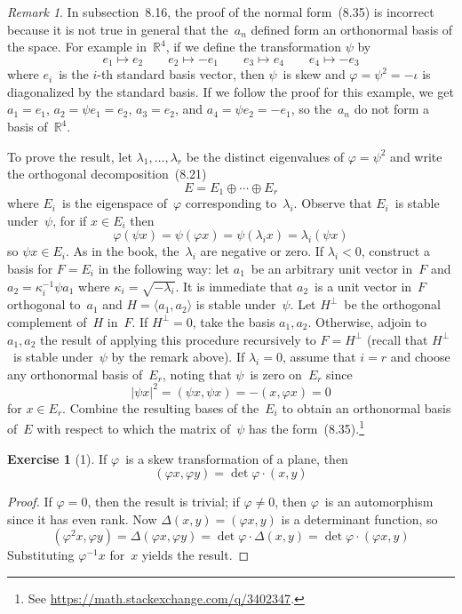 \documentclass[letterpaper,12pt]{article}
\newcommand{\R}{\mathbb{R}}
\newcommand{\dsum}{\oplus}
\newcommand{\mult}{\cdot}
\newcommand{\gen}[1]{\langle#1\rangle}
\newcommand{\oc}[1]{#1^{\perp}}
\newcommand{\iprod}[2]{(#1,#2)}
\newcommand{\norm}[1]{|#1|}
\theoremstyle{definition}
\newtheorem*{exer}{Exercise}
\theoremstyle{remark}
\newtheorem*{rmk}{Remark}
\begin{document}
\begin{rmk}
In subsection~8.16, the proof of the normal form~(8.35) is incorrect because it is not true in general that the~\(a_n\) defined form an orthonormal basis of the space. For example in~\(\R^4\), if we define the transformation \(\psi\) by
\[e_1\mapsto e_2\qquad e_2\mapsto -e_1\qquad e_3\mapsto e_4\qquad e_4\mapsto -e_3\]
where \(e_i\)~is the \(i\)-th standard basis vector, then \(\psi\)~is skew and \(\varphi=\psi^2=-\iota\) is diagonalized by the standard basis. If we follow the proof for this example, we get \(a_1=e_1\), \(a_2=\psi e_1=e_2\), \(a_3=e_2\), and \(a_4=\psi e_2=-e_1\), so the~\(a_n\) do not form a basis of~\(\R^4\).

To prove the result, let \(\lambda_1,\ldots,\lambda_r\) be the distinct eigenvalues of \(\varphi=\psi^2\) and write the orthogonal decomposition~(8.21)
\[E=E_1\dsum\cdots\dsum E_r\]
where \(E_i\)~is the eigenspace of~\(\varphi\) corresponding to~\(\lambda_i\). Observe that \(E_i\)~is stable under~\(\psi\), for if \(x\in E_i\) then
\[\varphi(\psi x)=\psi(\varphi x)=\psi(\lambda_i x)=\lambda_i(\psi x)\]
so \(\psi x\in E_i\). As in the book, the~\(\lambda_i\) are negative or zero. If \(\lambda_i<0\), construct a basis for \(F=E_i\) in the following way: let \(a_1\)~be an arbitrary unit vector in~\(F\) and \(a_2=\kappa_i^{-1}\psi a_1\) where \(\kappa_i=\sqrt{-\lambda_i}\). It is immediate that \(a_2\)~is a unit vector in~\(F\) orthogonal to~\(a_1\) and \(H=\gen{a_1,a_2}\) is stable under~\(\psi\). Let \(\oc{H}\)~be the orthogonal complement of~\(H\) in~\(F\). If \(\oc{H}=0\), take the basis \(a_1,a_2\). Otherwise, adjoin to \(a_1,a_2\) the result of applying this procedure recursively to \(F=\oc{H}\) (recall that \(\oc{H}\)~is stable under~\(\psi\) by the remark above). If \(\lambda_i=0\), assume that \(i=r\) and choose any orthonormal basis of~\(E_r\), noting that \(\psi\)~is zero on~\(E_r\) since
\[\norm{\psi x}^2=\iprod{\psi x}{\psi x}=-\iprod{x}{\varphi x}=0\]
for \(x\in E_r\). Combine the resulting bases of the~\(E_i\) to obtain an orthonormal basis of~\(E\) with respect to which the matrix of~\(\psi\) has the form~(8.35).\footnote{See \url{https://math.stackexchange.com/q/3402347}.}
\end{rmk}

\begin{exer}[1]
If \(\varphi\)~is a skew transformation of a plane, then
\[\iprod{\varphi x}{\varphi y}=\det\varphi\mult\iprod{x}{y}\]
\end{exer}
\begin{proof}
If \(\varphi=0\), then the result is trivial; if \(\varphi\ne 0\), then \(\varphi\)~is an automorphism since it has even rank. Now \(\Delta(x,y)=\iprod{\varphi x}{y}\) is a determinant function, so
\[\iprod{\varphi^2 x}{\varphi y}=\Delta(\varphi x,\varphi y)=\det\varphi\mult\Delta(x,y)=\det\varphi\mult\iprod{\varphi x}{y}\]
Substituting \(\varphi^{-1}x\) for~\(x\) yields the result.
\end{proof}
\end{document}
